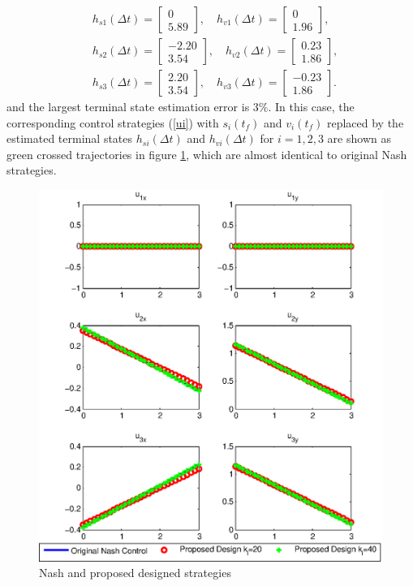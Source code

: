 \documentclass[12pt,draftcls,onecolumn]{IEEEtran}  %
\begin{document}
\begin{align*}
&h_{s1}(\Delta t)=\begin{bmatrix}
 0\\
    5.89
\end{bmatrix},\quad h_{v1}(\Delta t)=\begin{bmatrix}
   0\\
    1.96
\end{bmatrix},\\
&h_{s2}(\Delta t)=\begin{bmatrix}
 -2.20\\    3.54
\end{bmatrix},\quad h_{v2}(\Delta t)=\begin{bmatrix}
 0.23\\
    1.86
\end{bmatrix},\\
&h_{s3}(\Delta t)=\begin{bmatrix}
 2.20\\3.54
\end{bmatrix},\quad h_{v3}(\Delta t)=\begin{bmatrix}
-0.23\\    1.86
\end{bmatrix}.
\end{align*}
and the largest terminal state estimation error is $3\%$. In this case, the corresponding control strategies (\ref{ui}) with $s_i(t_f)$ and $v_i(t_f)$ replaced by the estimated terminal states $h_{si}(\Delta t)$ and $h_{vi}(\Delta t)$ for $i=1,2,3$ are shown as green crossed trajectories in figure \ref{Original_Distributed_control}, which are almost identical to original Nash strategies.
\begin{figure}[h]
      \centering
      \includegraphics[scale=0.58]{Original_Distributed_control.eps}
      \caption{Nash and proposed designed strategies}\label{Original_Distributed_control}
\end{figure}
\end{document}
